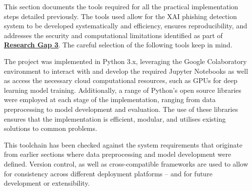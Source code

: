 
This section documents the tools required for all the practical implementation steps detailed previously. The tools used allow for the XAI phishing detection system to be developed systematically and efficiency, ensures reproducibility, and addresses the security and computational limitations identified as part of \hyperref[research-gap-3]{\uline{\textbf{Research Gap 3}}}. The careful selection of the following tools keep in mind.\newline

\noindent The project was implemented in Python 3.x, leveraging the Google Colaboratory environment to interact with and develop the required Jupyter Notebooks as well as access the necessary cloud computational resources, such as GPUs for deep learning model training. Additionally, a range of Python's open source libraries were employed at each stage of the implementation, ranging from data preprocessing to model development and evaluation. The use of these libraries ensures that the implementation is efficient, modular, and utilises existing solutions to common problems.\newline

\noindent This toolchain has been checked against the system requirements that originate from earlier sections where data preprocessing and model development were defined. Version control, as well as cross-compatible frameworks are used to allow for consistency across different deployment platforms -- and for future development or extensibility.
